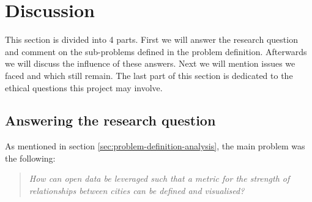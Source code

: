 \chapter{Discussion}

This section is divided into 4 parts. First we will answer the research question and comment on the sub-problems defined in the problem definition. Afterwards we will discuss the influence of these answers. Next we will mention issues we faced and which still remain. The last part of this section is dedicated to the ethical questions this project may involve.


\section{Answering the research question}


As mentioned in section \ref{sec:problem-definition-analysis}, the main problem was the following:
\begin{quote} 
\centering 
\textit{How can open data be leveraged such that a metric for the strength of relationships between cities can be defined and visualised?}
\end{quote}

